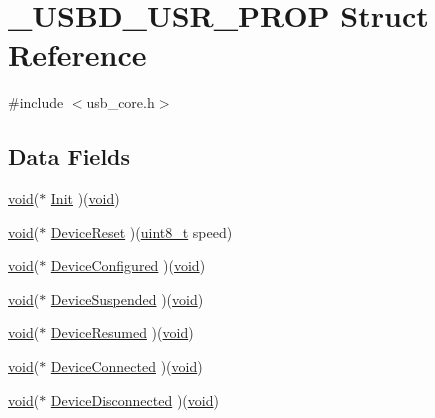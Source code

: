 \hypertarget{struct___u_s_b_d___u_s_r___p_r_o_p}{\section{\-\_\-\-U\-S\-B\-D\-\_\-\-U\-S\-R\-\_\-\-P\-R\-O\-P Struct Reference}
\label{struct___u_s_b_d___u_s_r___p_r_o_p}
}


{\ttfamily \#include $<$usb\-\_\-core.\-h$>$}

\subsection*{Data Fields}
\begin{DoxyCompactItemize}
\item 
\hyperlink{group___n_a_m_e_ga18028b8badbf1ea7e704ccac3c488e82}{void}($\ast$ \hyperlink{struct___u_s_b_d___u_s_r___p_r_o_p_ae47dce58c224e0fd42728a4597eb0d44}{Init} )(\hyperlink{group___n_a_m_e_ga18028b8badbf1ea7e704ccac3c488e82}{void})
\item 
\hyperlink{group___n_a_m_e_ga18028b8badbf1ea7e704ccac3c488e82}{void}($\ast$ \hyperlink{struct___u_s_b_d___u_s_r___p_r_o_p_af88fae9226df19090a29a95b6f8b6ddb}{Device\-Reset} )(\hyperlink{stdint_8h_aba7bc1797add20fe3efdf37ced1182c5}{uint8\-\_\-t} speed)
\item 
\hyperlink{group___n_a_m_e_ga18028b8badbf1ea7e704ccac3c488e82}{void}($\ast$ \hyperlink{struct___u_s_b_d___u_s_r___p_r_o_p_ab80d1e4953acf87ff332878704896f6e}{Device\-Configured} )(\hyperlink{group___n_a_m_e_ga18028b8badbf1ea7e704ccac3c488e82}{void})
\item 
\hyperlink{group___n_a_m_e_ga18028b8badbf1ea7e704ccac3c488e82}{void}($\ast$ \hyperlink{struct___u_s_b_d___u_s_r___p_r_o_p_a008ec58e797fb37500b88bf7217a5df6}{Device\-Suspended} )(\hyperlink{group___n_a_m_e_ga18028b8badbf1ea7e704ccac3c488e82}{void})
\item 
\hyperlink{group___n_a_m_e_ga18028b8badbf1ea7e704ccac3c488e82}{void}($\ast$ \hyperlink{struct___u_s_b_d___u_s_r___p_r_o_p_a6e539072c84690e10d39b2e25e41f929}{Device\-Resumed} )(\hyperlink{group___n_a_m_e_ga18028b8badbf1ea7e704ccac3c488e82}{void})
\item 
\hyperlink{group___n_a_m_e_ga18028b8badbf1ea7e704ccac3c488e82}{void}($\ast$ \hyperlink{struct___u_s_b_d___u_s_r___p_r_o_p_a985b792fc5106834e2b17d212369ffcd}{Device\-Connected} )(\hyperlink{group___n_a_m_e_ga18028b8badbf1ea7e704ccac3c488e82}{void})
\item 
\hyperlink{group___n_a_m_e_ga18028b8badbf1ea7e704ccac3c488e82}{void}($\ast$ \hyperlink{struct___u_s_b_d___u_s_r___p_r_o_p_afa86ff3cbe54b6f26a61463be2061c49}{Device\-Disconnected} )(\hyperlink{group___n_a_m_e_ga18028b8badbf1ea7e704ccac3c488e82}{void})
\end{DoxyCompactItemize}


